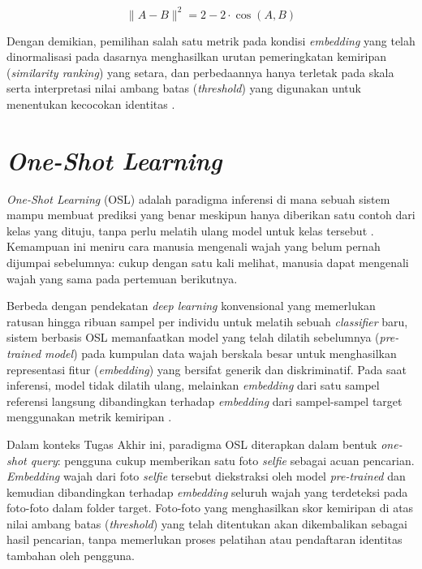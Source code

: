 \begin{equation}
\|A - B\|^2 = 2 - 2 \cdot \cos(A, B)
\label{eq:euclidean2}
\end{equation}

Dengan demikian, pemilihan salah satu metrik pada kondisi \textit{embedding} yang telah dinormalisasi pada dasarnya menghasilkan urutan pemeringkatan kemiripan (\textit{similarity ranking}) yang setara, dan perbedaannya hanya terletak pada skala serta interpretasi nilai ambang batas (\textit{threshold}) yang digunakan untuk menentukan kecocokan identitas \autocite{deng2019arcface}.

\section{\textit{One-Shot Learning}}

\textit{One-Shot Learning} (OSL) adalah paradigma inferensi di mana sebuah sistem mampu membuat prediksi yang benar meskipun hanya diberikan satu contoh dari kelas yang dituju, tanpa perlu melatih ulang model untuk kelas tersebut \autocite{Albayati2024}. Kemampuan ini meniru cara manusia mengenali wajah yang belum pernah dijumpai sebelumnya: cukup dengan satu kali melihat, manusia dapat mengenali wajah yang sama pada pertemuan berikutnya.

Berbeda dengan pendekatan \textit{deep learning} konvensional yang memerlukan ratusan hingga ribuan sampel per individu untuk melatih sebuah \textit{classifier} baru, sistem berbasis OSL memanfaatkan model yang telah dilatih sebelumnya (\textit{pre-trained model}) pada kumpulan data wajah berskala besar untuk menghasilkan representasi fitur (\textit{embedding}) yang bersifat generik dan diskriminatif. Pada saat inferensi, model tidak dilatih ulang, melainkan \textit{embedding} dari satu sampel referensi langsung dibandingkan terhadap \textit{embedding} dari sampel-sampel target menggunakan metrik kemiripan \autocite{Albayati2024}.

Dalam konteks Tugas Akhir ini, paradigma OSL diterapkan dalam bentuk \textit{one-shot query}: pengguna cukup memberikan satu foto \textit{selfie} sebagai acuan pencarian. \textit{Embedding} wajah dari foto \textit{selfie} tersebut diekstraksi oleh model \textit{pre-trained} dan kemudian dibandingkan terhadap \textit{embedding} seluruh wajah yang terdeteksi pada foto-foto dalam folder target. Foto-foto yang menghasilkan skor kemiripan di atas nilai ambang batas (\textit{threshold}) yang telah ditentukan akan dikembalikan sebagai hasil pencarian, tanpa memerlukan proses pelatihan atau pendaftaran identitas tambahan oleh pengguna.


